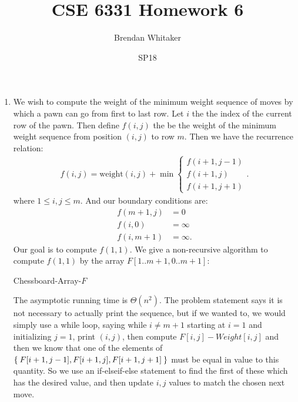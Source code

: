 \documentclass[10pt,oneside,reqno]{amsart}
\makeatletter
\theoremstyle{plain}
\theoremstyle{definition}
\theoremstyle{remark}
\newcommand{\bb}{\vspace{3mm}}
\newcommand{\bee}{\begin{equation}\begin{aligned}}
\newcommand{\eee}{\end{aligned}\end{equation}}
\newenvironment{restoretext}%
    {\@parboxrestore%
     \begin{adjustwidth}{}{\leftmargin}%
    }{\end{adjustwidth}
     }
\makeatother
\begin{document}
\title{CSE 6331 Homework 6}

\date{SP18}

\author[Brendan Whitaker]{Brendan Whitaker}

\maketitle



\begin{enumerate}[label=\arabic*.]

\item We wish to compute the weight of the minimum weight sequence of moves by which a pawn can go from first to last row. Let $i$ the the index of the current row of the pawn. Then define $f(i,j)$ the be the weight of the minimum weight sequence from position $(i,j)$ to row $m$. Then we have the recurrence relation:
\bee
f(i,j) = \text{weight}(i,j) + \min \begin{cases}
f(i + 1,j - 1)\\
f(i + 1,j)\\
f(i + 1,j + 1)
\end{cases}.
\eee
where $1 \leq i,j \leq m$. And our boundary conditions are:
\bee
f(m + 1,j) &= 0\\
f(i,0) &= \infty\\
f(i,m + 1) &= \infty.
\eee
Our goal is to compute $f(1,1)$. We give a non-recursive algorithm to compute $f(1,1)$ by the array $F[1..m + 1,0..m + 1]$:
\bb
\begin{restoretext}
\begin{algorithm}[H]\label{alg1}
\caption{Chessboard-Array-$F$}
\end{algorithm}
\end{restoretext}
The asymptotic running time is $\Theta(n^2)$. The problem statement says it is not necessary to actually print the sequence, but if we wanted to, we would simply use a while loop, saying while $i \neq m + 1$ starting at $i = 1$ and initializing $j = 1$, print $(i,j)$, then compute $F[i,j] - Weight[i,j]$ and then we know that one of the elements of $\Set{F[i + 1,j - 1],F[i + 1,j],F[i + 1,j + 1]}$ must be equal in value to this quantity. So we use an if-elseif-else statement to find the first of these which has the desired value, and then update $i,j$ values to match the chosen next move. 







\end{enumerate}
\end{document}
